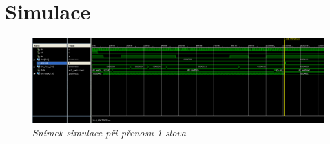 \documentclass[12pt]{article}
\begin{document}
\newpage
\section{Simulace}
\begin{center}
  \begin{figure}[h!]
    \hfill\includegraphics[scale=0.38]{simout}\hspace*{\fill}
    \caption{\textit{Snímek simulace při přenosu 1 slova}}
  \end{figure}
\end{center}
\end{document}
